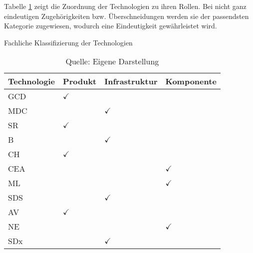 Tabelle \ref{tab:class_tech} zeigt die Zuordnung der Technologien zu ihren Rollen. Bei nicht ganz eindeutigen Zugehörigkeiten bzw. Überschneidungen werden sie der passendsten Kategorie zugewiesen, wodurch eine Eindeutigkeit gewährleistet wird.

\begin{table}
	\caption{Fachliche Klassifizierung der Technologien}
	\selectfont
	\centering
	\label{tab:class_tech}
	\begin{tabularx}{\linewidth}{X|XXX}
		Technologie & Produkt & Infrastruktur & Komponente \\
		\hline
		\acs{GCD} & $\checkmark$ & & \\
		\hline
		\acs{MDC} & & $\checkmark$ & \\
		\hline
		\acs{SR} & $\checkmark$ & & \\
		\hline
		\acs{B} & & $\checkmark$ & \\
		\hline
		\acs{CH} & $\checkmark$ & & \\
		\hline
		\acs{CEA} & & & $\checkmark$ \\
		\hline
		\acs{ML} & & & $\checkmark$ \\
		\hline
		\acs{SDS} & & $\checkmark$ & \\
		\hline
		\acs{AV} & $\checkmark$ & & \\
		\hline
		\acs{NE} & & & $\checkmark$ \\
		\hline
		\acs{SDx} & & $\checkmark$ & \\
		\hline
	\end{tabularx}
	\caption*{Quelle: Eigene Darstellung}
\end{table}